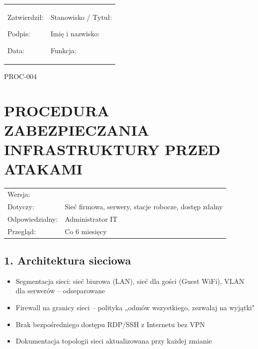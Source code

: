 \documentclass[12pt,a4paper]{article}
\providecommand{\tightlist}{\setlength{\itemsep}{0pt}\setlength{\parskip}{0pt}}
\begin{document}
\begin{longtable}[]{@{}
  >{\raggedright\arraybackslash}p{}
  >{\raggedright\arraybackslash}p{}@{}}
\toprule\noalign{}
\endhead
\bottomrule\noalign{}
\endlastfoot
\begin{minipage}[t]{\linewidth}\raggedright
Zatwierdził:

Podpis: \underline{\hspace{3cm}}

Data: \underline{\hspace{4cm}}
\end{minipage} & \begin{minipage}[t]{\linewidth}\raggedright
Stanowisko / Tytuł:

Imię i nazwisko: \underline{\hspace{3cm}}

Funkcja: \underline{\hspace{3cm}}
\end{minipage} \\
\end{longtable}

\label{doc4}
PROC-004

\section{PROCEDURA ZABEZPIECZANIA INFRASTRUKTURY PRZED
ATAKAMI}\label{procedura-zabezpieczania-infrastruktury-przed-atakami}

\begin{longtable}[]{@{}>{\raggedright\arraybackslash}p{}>{\raggedright\arraybackslash}p{}@{}}
\toprule\noalign{}
\endhead
\bottomrule\noalign{}
\endlastfoot
Wersja: & 1.0 \\
Dotyczy: & Sieć firmowa, serwery, stacje robocze, dostęp zdalny \\
Odpowiedzialny: & Administrator IT \\
Przegląd: & Co 6 miesięcy \\
\end{longtable}

\subsection{1. Architektura sieciowa}\label{architektura-sieciowa}

\begin{itemize}
\tightlist
\item
  Segmentacja sieci: sieć biurowa (LAN), sieć dla gości (Guest WiFi),
  VLAN dla serwerów -- odseparowane
\item
  Firewall na granicy sieci -- polityka „odmów wszystkiego, zezwalaj na
  wyjątki"
\item
  Brak bezpośredniego dostępu RDP/SSH z Internetu bez VPN
\item
  Dokumentacja topologii sieci aktualizowana przy każdej zmianie
\end{itemize}
\end{document}
